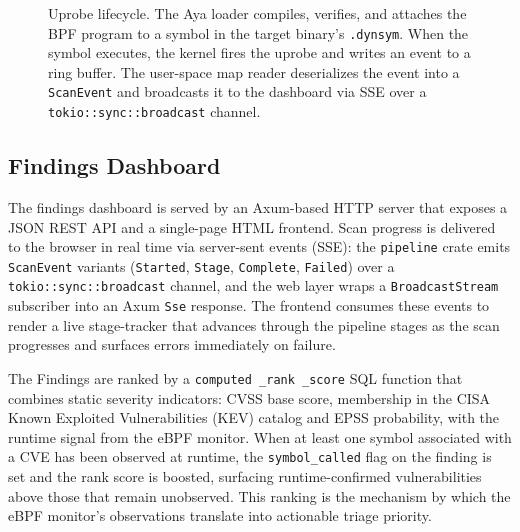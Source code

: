 \documentclass[conference]{IEEEtran}
\begin{document}
\begin{figure}[t]
  \caption{Uprobe lifecycle. The Aya loader compiles, verifies,
    and attaches the BPF program to a symbol in the target
    binary's \texttt{.dynsym}. When the symbol executes, the
    kernel fires the uprobe and writes an event to a ring buffer.
    The user-space map reader deserializes the event into a
    \texttt{ScanEvent} and broadcasts it to the dashboard via
    SSE over a \texttt{tokio::sync::broadcast} channel.}
  \label{fig:uprobe-lifecycle}
\end{figure}

\subsection{Findings Dashboard}

The findings dashboard is served by an Axum-based HTTP server that exposes a JSON REST API and a single-page HTML frontend. Scan progress is delivered to the browser in real time via server-sent events (SSE): the \texttt{pipeline} crate emits \texttt{ScanEvent} variants (\texttt{Started}, \texttt{Stage}, \texttt{Complete}, \texttt{Failed}) over a \texttt{tokio::sync::broadcast} channel, and the web layer wraps a \texttt{BroadcastStream} subscriber into an Axum \texttt{Sse} response. The frontend consumes these events to render a live stage-tracker that advances through the pipeline stages as the scan progresses and surfaces errors immediately on failure.

The Findings are ranked by a \texttt{computed \_rank \_score} SQL function that combines static severity indicators: CVSS base score, membership in the CISA Known Exploited Vulnerabilities (KEV) catalog and EPSS probability, with the runtime signal from the eBPF monitor. When at least one symbol associated with a CVE has been observed at runtime, the \texttt{symbol\_called} flag on the finding is set and the rank score is boosted, surfacing runtime-confirmed vulnerabilities above those that remain unobserved. This ranking is the mechanism by which the eBPF monitor's observations translate into actionable triage priority.
\end{document}
